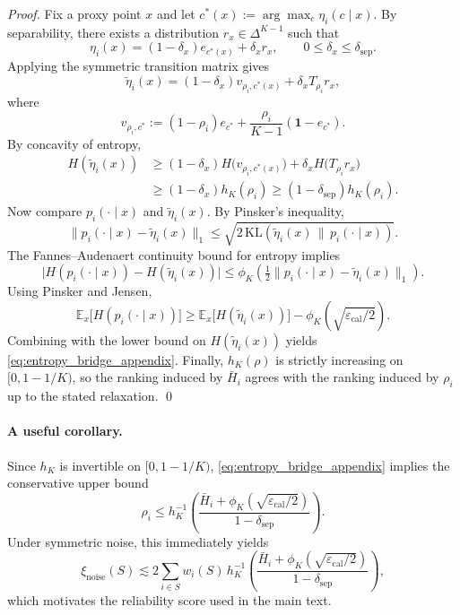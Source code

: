 \documentclass[conference]{IEEEtran}
\theoremstyle{definition}
\theoremstyle{remark}
\begin{document}
\begin{proof}
Fix a proxy point $x$ and let $c^*(x):=\arg\max_c \eta_i(c\mid x)$. By separability, there exists a distribution $r_x\in\Delta^{K-1}$ such that
\begin{equation}
\eta_i(x)
=
(1-\delta_x)e_{c^*(x)} + \delta_x r_x,
\qquad 0\le \delta_x \le \delta_{\mathrm{sep}}.
\end{equation}
Applying the symmetric transition matrix gives
\begin{equation}
\tilde\eta_i(x)
=
(1-\delta_x)v_{\rho_i,c^*(x)} + \delta_x T_{\rho_i}r_x,
\end{equation}
where
\begin{equation}
v_{\rho_i,c^*}
:=
(1-\rho_i)e_{c^*}
+ \frac{\rho_i}{K-1}(\mathbf{1}-e_{c^*}).
\end{equation}
By concavity of entropy,
\begin{align}
H(\tilde\eta_i(x))
&\ge
(1-\delta_x)H\big(v_{\rho_i,c^*(x)}\big)
+\delta_x H\big(T_{\rho_i}r_x\big) \\
&\ge
(1-\delta_x)h_K(\rho_i)
\ge
(1-\delta_{\mathrm{sep}})h_K(\rho_i).
\end{align}
Now compare $p_i(\cdot\mid x)$ and $\tilde\eta_i(x)$. By Pinsker's inequality,
\begin{equation}
\|p_i(\cdot\mid x)-\tilde\eta_i(x)\|_1
\le
\sqrt{2\,\mathrm{KL}(\tilde\eta_i(x)\,\|\,p_i(\cdot\mid x))}.
\end{equation}
The Fannes--Audenaert continuity bound for entropy implies
\begin{equation}
\big|H(p_i(\cdot\mid x))-H(\tilde\eta_i(x))\big|
\le
\phi_K\!\left(\tfrac{1}{2}\|p_i(\cdot\mid x)-\tilde\eta_i(x)\|_1\right).
\end{equation}
Using Pinsker and Jensen,
\begin{equation}
\mathbb{E}_{x}\big[H(p_i(\cdot\mid x))\big]
\ge
\mathbb{E}_{x}\big[H(\tilde\eta_i(x))\big]
-
\phi_K\!\left(\sqrt{\varepsilon_{\mathrm{cal}}/2}\right).
\end{equation}
Combining with the lower bound on $H(\tilde\eta_i(x))$ yields \eqref{eq:entropy_bridge_appendix}. Finally, $h_K(\rho)$ is strictly increasing on $[0,1-1/K)$, so the ranking induced by $\bar H_i$ agrees with the ranking induced by $\rho_i$ up to the stated relaxation. \qed
\end{proof}

\paragraph{A useful corollary.}
Since $h_K$ is invertible on $[0,1-1/K)$, \eqref{eq:entropy_bridge_appendix} implies the conservative upper bound
\begin{equation}
\rho_i
\le
h_K^{-1}\!\left(
\frac{\bar H_i+\phi_K(\sqrt{\varepsilon_{\mathrm{cal}}/2})}{1-\delta_{\mathrm{sep}}}
\right).
\end{equation}
Under symmetric noise, this immediately yields
\begin{equation}
\xi_{\mathrm{noise}}(S)
\lesssim
2\sum_{i\in S}w_i(S)
\,h_K^{-1}\!\left(
\frac{\bar H_i+\phi_K(\sqrt{\varepsilon_{\mathrm{cal}}/2})}{1-\delta_{\mathrm{sep}}}
\right),
\end{equation}
which motivates the reliability score used in the main text.
\end{document}
